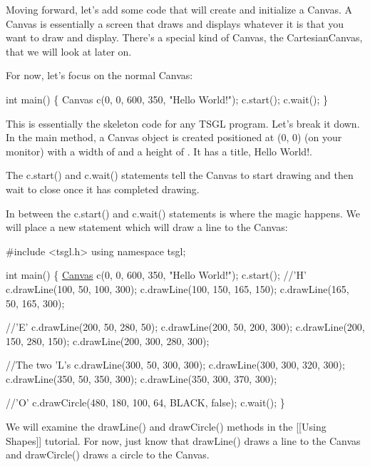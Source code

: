 Moving forward, let's add some code that will create and initialize a Canvas. A Canvas is essentially a screen that draws and displays whatever it is that you want to draw and display. There's a special kind of Canvas, the Cartesian\-Canvas, that we will look at later on.

For now, let's focus on the normal Canvas\-:


\begin{DoxyCode}
\textcolor{keywordtype}{int} main() \{
  Canvas c(0, 0, 600, 350, \textcolor{stringliteral}{"Hello World!"});
  c.start();
  c.wait();
\}
\end{DoxyCode}


This is essentially the skeleton code for any T\-S\-G\-L program. Let's break it down. In the main method, a Canvas object is created positioned at {\ttfamily (0, 0)} (on your monitor) with a width of {} and a height of {}. It has a title, {\ttfamily Hello World!}.

The {\ttfamily c.\-start()} and {\ttfamily c.\-wait()} statements tell the Canvas to start drawing and then wait to close once it has completed drawing.

In between the {\ttfamily c.\-start()} and {\ttfamily c.\-wait()} statements is where the magic happens. We will place a new statement which will draw a line to the Canvas\-:


\begin{DoxyCode}
\textcolor{preprocessor}{#include <tsgl.h>}
\textcolor{keyword}{using namespace }tsgl;

\textcolor{keywordtype}{int} main() \{
  \hyperlink{classtsgl_1_1_canvas}{Canvas} c(0, 0, 600, 350, \textcolor{stringliteral}{"Hello World!"});
  c.start();
  \textcolor{comment}{//'H'}
  c.drawLine(100, 50, 100, 300);
  c.drawLine(100, 150, 165, 150);
  c.drawLine(165, 50, 165, 300);

  \textcolor{comment}{//'E'}
  c.drawLine(200, 50, 280, 50);
  c.drawLine(200, 50, 200, 300);
  c.drawLine(200, 150, 280, 150);
  c.drawLine(200, 300, 280, 300);

  \textcolor{comment}{//The two 'L's}
  c.drawLine(300, 50, 300, 300);
  c.drawLine(300, 300, 320, 300);
  c.drawLine(350, 50, 350, 300);
  c.drawLine(350, 300, 370, 300);

  \textcolor{comment}{//'O'}
  c.drawCircle(480, 180, 100, 64, BLACK, \textcolor{keyword}{false});
  c.wait();
\}
\end{DoxyCode}


We will examine the {\ttfamily draw\-Line()} and {\ttfamily draw\-Circle()} methods in the \mbox{[}\mbox{[}Using Shapes\mbox{]}\mbox{]} tutorial. For now, just know that {\ttfamily draw\-Line()} draws a line to the Canvas and {\ttfamily draw\-Circle()} draws a circle to the Canvas.

